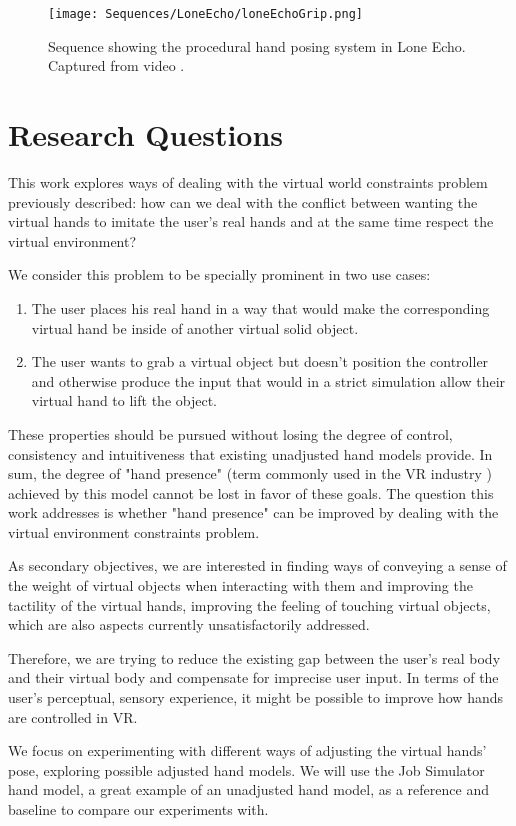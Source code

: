 \begin{figure}[H]
\centering
\texttt{[image: Sequences/LoneEcho/loneEchoGrip.png]}
\caption{Sequence showing the procedural hand posing system in Lone Echo. Captured from video \parencite{loneEchoVideo}.}
\label{fig:loneEchoGrip}
\end{figure}

\section{Research Questions}
\label{sec:researchQuestions}

This work explores ways of dealing with the virtual world constraints problem previously described: how can we deal with the conflict between wanting the virtual hands to imitate the user's real hands and at the same time respect the virtual environment?

We consider this problem to be specially prominent in two use cases:

\begin{enumerate}
\item The user places his real hand in a way that would make the corresponding virtual hand be inside of another virtual solid object.
\item The user wants to grab a virtual object but doesn't position the controller and otherwise produce the input that would in a strict simulation allow their virtual hand to lift the object.
\end{enumerate}

These properties should be pursued without losing the degree of control, consistency and intuitiveness that existing unadjusted hand models provide. In sum, the degree of "hand presence" (term commonly used in the VR industry \parencite{Bye2016}) achieved by this model cannot be lost in favor of these goals. The question this work addresses is whether "hand presence" can be improved by dealing with the virtual environment constraints problem.


As secondary objectives, we are interested in finding ways of conveying a sense of the weight of virtual objects when interacting with them and improving the tactility of the virtual hands, improving the feeling of touching virtual objects, which are also aspects currently unsatisfactorily addressed.

Therefore, we are trying to reduce the existing gap between the user's real body and their virtual body and compensate for imprecise user input. In terms of the user's perceptual, sensory experience, it might be possible to improve how hands are controlled in VR.

We focus on experimenting with different ways of adjusting the virtual hands' pose, exploring possible adjusted hand models. We will use the Job Simulator hand model, a great example of an unadjusted hand model, as a reference and baseline to compare our experiments with.